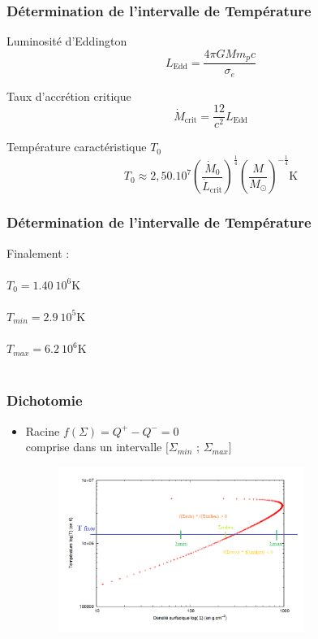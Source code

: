 \begin{frame}
\frametitle{Détermination de l'intervalle de Température} 
Luminosité d'Eddington
   \begin{equation}
      L_\mathrm{Edd} = \frac{4\pi GMm_pc}{\sigma_e}
   \end{equation}

Taux d’accrétion critique 
   \begin{equation}
      \dot{M}_\mathrm{crit} = \frac{12}{c^2}L_\mathrm{Edd} 
   \end{equation}

Température caractéristique $T_0$
   \begin{equation}
      T_0 \approx 2,50.10^7\left(\frac{\dot{M}_0}{\dot{L}_\mathrm{crit}}\right)^{\frac{1}{4}}\left(\frac{M}{M_\odot}\right)^{-\frac{1}{4}} \mathrm{K}
   \end{equation}


\end{frame}


\begin{frame}
\frametitle{Détermination de l'intervalle de Température} 

   Finalement :\\~\\ 

 $ T_0 =1.40\ 10^6 \mathrm{K} $ \\~\\
   
 $  T_{min} = 2.9\ 10^5 \mathrm{K} $ \\~\\
    
  $ T_{max} = 6.2\ 10^6 \mathrm{K} $ \\~\\
\end{frame}



\begin{frame}
\frametitle{Dichotomie}

   \begin{itemize}
      \item Racine $f(\Sigma) = Q^+ - Q^- = 0$
      \\ comprise dans un intervalle $[\Sigma_{min}$ ; $\Sigma_{max}]$
      \begin{figure}[htb!]
         \includegraphics[width=8cm]{figures/dicho_1.png}
      \end{figure}
   \end{itemize}
\end{frame}

